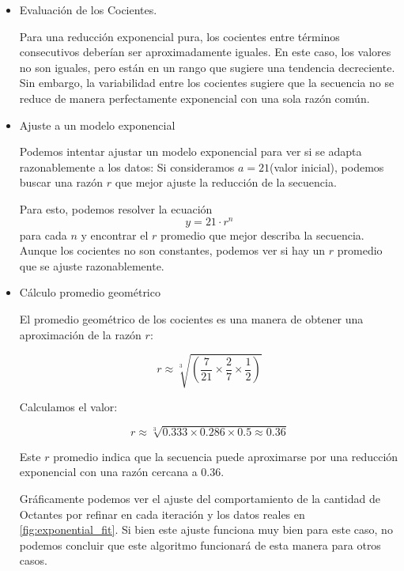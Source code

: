 \begin{itemize}
    \item Evaluación de los Cocientes.

    Para una reducción exponencial pura, los cocientes entre términos consecutivos deberían ser aproximadamente iguales. En este caso, los valores no son iguales, pero están en un rango que sugiere una tendencia decreciente. Sin embargo, la variabilidad entre los cocientes sugiere que la secuencia no se reduce de manera perfectamente exponencial con una sola razón común.

    \item Ajuste a un modelo exponencial

    Podemos intentar ajustar un modelo exponencial para ver si se adapta razonablemente a los datos:
    Si consideramos $a  = 21$(valor inicial), podemos buscar una razón $r$ que mejor ajuste la reducción de la secuencia.
    
    Para esto, podemos resolver la ecuación $$y = 21 \cdot r^n$$ para cada $n$ y encontrar el $r$ promedio que mejor describa la secuencia. Aunque los cocientes no son constantes, podemos ver si hay un $r$ promedio que se ajuste razonablemente.

    \item Cálculo promedio geométrico

    El promedio geométrico de los cocientes es una manera de obtener una aproximación de la razón $r$:

        $$ r \approx \sqrt[3]{ \left( \frac{7}{21} \times \frac{2}{7} \times \frac{1}{2} \right) }$$

    Calculamos el valor:

    $$ r \approx \sqrt[3]{0.333 \times 0.286 \times 0.5 \approx 0.36} $$

    Este $r$ promedio indica que la secuencia puede aproximarse por una reducción exponencial con una razón cercana a $0.36$.

    Gráficamente podemos ver el ajuste del comportamiento de la cantidad de Octantes por refinar en cada iteración y los datos reales en \autoref{fig:exponential_fit}. Si bien este ajuste funciona muy bien para este caso, no podemos concluir que este algoritmo funcionará de esta manera para otros casos.

\end{itemize}

